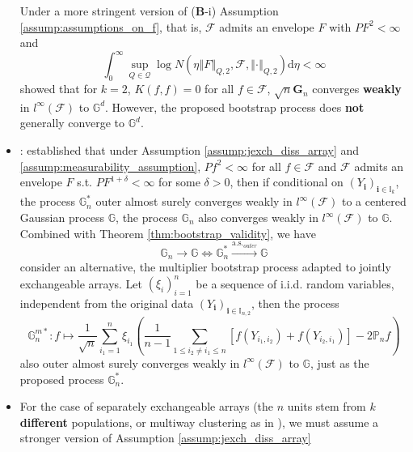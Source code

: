 \documentclass[twoside]{article}
\begin{document}
\begin{itemize}
    Under a more stringent version of (\textbf{B}-i) Assumption \ref{assump:assumptions_on_f}, that is, $\mathcal{F}$ admits an envelope $F$ with $PF^2< \infty$ and 
    $$
    \int^{\infty}_0 \sup_{Q\in\mathcal{Q}} \log N\left(\eta \left\Vert F \right\Vert _{Q,2},\mathcal{F}, \left\Vert \cdot \right\Vert _{Q,2}\right)\mathrm{d}\eta <\infty
    $$
    \citet{davezies2021empirical} showed that for $k=2$, $K(f,f)=0$ for all $f\in\mathcal{F}$, $\sqrt{n}\mathbf{G}_n$ converges \textbf{weakly} in $l^{\infty}(\mathcal{F})$ to $\mathbb{G}^d$. However, the proposed bootstrap process does \textbf{not} generally converge to $\mathbb{G}^d$.
    \item {}: \citet{davezies2021empirical} established that under Assumption \ref{assump:jexch_diss_array} and \ref{assump:measurability_assumption}, $Pf^2<\infty$ for all $f\in \mathcal{F}$ and $\mathcal{F}$ admits an envelope $F$ s.t. $PF^{1+\delta}<\infty$ for some $\delta>0$, then if conditional on $\left(Y_{\mathbf{i}}\right)_{\mathbf{i}\in\mathbb{I}_k}$, the process $\mathbb{G}_n^*$ outer almost surely converges weakly in $l^{\infty}\left(\mathcal{F}\right)$ to a centered Gaussian process $\mathbb{G}$, the process $\mathbb{G}_n$ also converges weakly in $l^{\infty}(\mathcal{F})$ to $\mathbb{G}$. 
    Combined with Theorem \ref{thm:bootstrap_validity}, we have $$ \mathbb{G}_n \rightarrow \mathbb{G} \Leftrightarrow \mathbb{G}^*_n \xrightarrow{\mathrm{a.s.}_{outer}} \mathbb{G} $$
    consider an alternative, the multiplier bootstrap process adapted to jointly exchangeable arrays. Let $\left(\xi_i\right)^n_{i=1}$ be a sequence of i.i.d. random variables, independent from the original data $\left(Y_{\mathbf{i}}\right)_{\mathbf{i}\in \mathbb{I}_{n,2}}$, then the process 
    \begin{equation*}
        \mathbb{G}^{m*}_{n}:f \mapsto \frac{1}{\sqrt{n}}\sum^n_{i_1=1} \xi_{i_1} \left(\frac{1}{n-1}\sum_{1\leq i_2\neq i_1\leq n} \left[f(Y_{i_1,i_2})+f(Y_{i_2,i_1})\right] - 2\mathbb{P}_n f\right)
    \end{equation*}
    also outer almost surely converges weakly in $l^{\infty}(\mathcal{F})$ to $\mathbb{G}$, just as the proposed process $\mathbb{G}_n^*$.
    \item {} For the case of separately exchangeable arrays (the $n$ units stem from $k$ \textbf{different} populations, or multiway clustering as in \citet{menzel2021bootstrap}), we must assume a stronger version of Assumption \ref{assump:jexch_diss_array}

\end{itemize}
\end{document}
